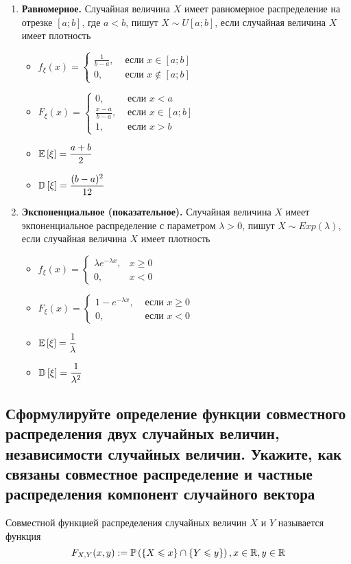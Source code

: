 \documentclass{article}
\begin{document}
\begin{enumerate}
\begin{itemize}
    \end{itemize}
    \item \textbf{Равномерное.} Случайная величина $X$ имеет равномерное распределение на отрезке $[a;b]$, где $a<b$, пишут $X\sim U[a;b]$, если случайная величина $X$ имеет плотность 
    \begin{itemize}
        \item $f_{\xi}(x)=\begin{cases}
            \frac{1}{b-a},&\text{ если }x\in[a;b]\\
            0,&\text{ если }x\not\in[a;b]
        \end{cases}$
        \item $F_{\xi}(x)=\begin{cases}
            0,&\text{ если }x<a\\
            \frac{x-a}{b-a},&\text{ если }x\in[a;b]\\
            1,&\text{ если }x>b
        \end{cases}$
        \item $\mathbb{E}\left[\xi\right]=\displaystyle\frac{a+b}{2}$
        \item $\mathbb{D}\left[\xi\right]=\displaystyle\frac{(b-a)^2}{12}$
    \end{itemize}
    \item \textbf{Экспоненциальное (показательное).} Случайная величина $X$ имеет экпоненциальное распределение с параметром $\lambda>0$, пишут $X\sim Exp(\lambda)$, если случайная величина $X$ имеет плотность
    \begin{itemize}
        \item $f_{\xi}(x)=\begin{cases}
            \lambda e^{-\lambda x},&x\geqslant0\\
            0,&x<0
        \end{cases}$
        \item $F_{\xi}(x)=\begin{cases}
            1-e^{-\lambda x},&\text{ если }x\geqslant0\\
            0,&\text{ если }x<0
        \end{cases}$
        \item $\mathbb{E}\left[\xi\right]=\displaystyle\frac{1}{\lambda}$
        \item $\mathbb{D}\left[\xi\right]=\displaystyle\frac{1}{\lambda^2}$
    \end{itemize}
\end{enumerate}

\subsection{Сформулируйте определение функции совместного распределения двух случайных величин, независимости случайных величин. Укажите, как связаны совместное распределение и частные распределения компонент случайного вектора}
 Совместной функцией распределения случайных величин $X$ и $Y$ называется функция
\begin{equation*}
    F_{X,Y}(x,y):=\mathbb{P}\left(\{X\leqslant x\}\cap\{Y\leqslant y\}\right), x\in\mathbb{R},y\in\mathbb{R}
\end{equation*}
\end{document}
